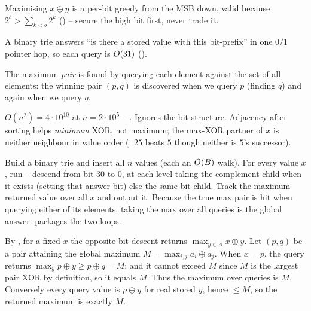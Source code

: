 \begin{observation}
Maximising $x\oplus y$ is a per-bit greedy from the MSB down, valid because $2^b > \sum_{k<b}2^k$
() -- secure the high bit first, never trade it.
\end{observation}
\begin{observation}
A binary trie answers ``is there a stored value with this bit-prefix'' in one $0/1$ pointer hop, so each
query is $O(31)$ ().
\end{observation}
\begin{observation}
The maximum \emph{pair} is found by querying each element against the set of all elements: the winning
pair $(p,q)$ is discovered when we query $p$ (finding $q$) and again when we query $q$.
\end{observation}

\begin{thinkbox}
{$O(n^2)=4\cdot 10^{10}$ at $n=2\cdot 10^5$ -- \re. Ignores the bit structure.}
{Adjacency after sorting helps \emph{minimum} XOR, not maximum; the max-XOR partner of $x$ is neither
neighbour in value order (: $25$ beats $5$ though neither is $5$'s successor).}
\end{thinkbox}

Build a binary trie and insert all $n$ values (each an $O(B)$ walk). For every value $x$, run
 -- descend from bit $30$ to $0$, at each level taking the complement child when it
exists (setting that answer bit) else the same-bit child. Track the maximum returned value over all $x$
and output it. Because the true max pair is hit when querying either of its elements, taking the max over
all queries is the global answer.  packages the two loops.

\begin{proofbox}
By , for a fixed $x$ the opposite-bit descent returns $\max_{y\in A} x\oplus y$.
Let $(p,q)$ be a pair attaining the global maximum $M=\max_{i,j} a_i\oplus a_j$. When $x=p$, the query
returns $\max_y p\oplus y \ge p\oplus q = M$; and it cannot exceed $M$ since $M$ is the largest pair XOR
by definition, so it equals $M$. Thus the maximum over queries is $M$. Conversely every query value is
$p\oplus y$ for real stored $y$, hence $\le M$, so the returned maximum is exactly $M$. \end{proofbox}

